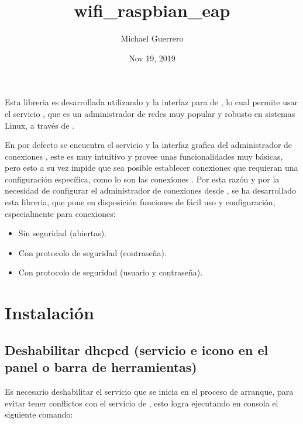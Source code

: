 \documentclass[letterpaper,10pt,english]{sphinxhowto}
\title{wifi\_raspbian\_eap}
\date{Nov 19, 2019}
\author{Michael Guerrero}
\begin{document}
\pagestyle{empty}
\sphinxmaketitle
\pagestyle{plain}
\sphinxtableofcontents
\pagestyle{normal}
\label{\detokenize{index::doc}}


Esta libreria es desarrollada utilizando  y la interfaz para  de ,
lo cual permite usar el servicio , que es un administrador de redes muy popular
y robusto en sistemas Linux, a través de .

En  por defecto se encuentra el servicio y la interfaz grafica del administrador de
conexiones , este es muy intuitivo y provee unas funcionalidades muy básicas, pero esto
a su vez impide que sea posible establecer conexiones que requieran una configuración específica,
como lo son las conexiones . Por esta razón y por la necesidad de configurar el
administrador de conexiones desde , se ha desarrollado esta libreria, que pone en
disposición funciones de fácil uso y configuración, especialmente para conexiones:
\begin{itemize}
\item {} 
Sin seguridad (abiertas).

\item {} 
Con protocolo de seguridad  (contraseña).

\item {} 
Con protocolo de seguridad  (usuario y contraseña).

\end{itemize}


\chapter{Instalación}
\label{\detokenize{index:instalacion}}

\section{Deshabilitar dhcpcd (servicio e icono en el panel o barra de herramientas)}
\label{\detokenize{index:deshabilitar-dhcpcd-servicio-e-icono-en-el-panel-o-barra-de-herramientas}}
Es necesario deshabilitar el servicio  que se inicia en el proceso de arranque, para
evitar tener conflictos con el servicio de , esto logra ejecutando en consola
el siguiente comando:
\end{document}
